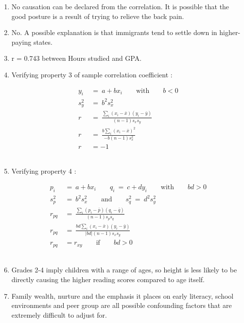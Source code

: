 \begin{enumerate}
	\item No causation can be declared from the correlation. It is possible that the good posture is a result of trying to relieve the back pain.
	
	\item No. A possible explanation is that immigrants tend to settle down in higher-paying states.
	
	\item r = 0.743 between Hours studied and GPA.
	
	\item 	Verifying property 3 of sample correlation coefficient : 
	
	
		\begin{align}
			y_i \ &=\  a + b x_i \qquad \text{with} \qquad b < 0 \\
			s_{y}^{2} \ &=\ b^2 s_{x}^2 \\
			r \ &=\ \frac{\sum_{i} (x_i - \bar{x}) (y_i - \bar{y})}{(n - 1) s_x s_y} \\
			r \ &=\ \frac{b \sum_{i} (x_i - \bar{x})^{2}}{- b (n - 1) s_{x}^{2}} \\
			r &= -1			
		\end{align}
	\\
	
	\item Verifying property 4 : 
	
	
		\begin{align}
			p_i \ &=\  a + b x_i \qquad q_i \ =\  c + d y_i \qquad \text{with} \qquad bd > 0 \\
			s_{p}^{2} \ &=\ b^2 s_{x}^2 \qquad \text{and} \qquad s_{q}^{2} \ =\ d^2 s_{y}^2 \\
			r_{pq} \ &=\ \frac{\sum_{i} (p_i - \bar{p}) (q_i - \bar{q})}{(n - 1) s_p s_q} \\
			r_{pq} \ &=\ \frac{bd \sum_{i} (x_i - \bar{x}) (y_i - \bar{y})}{|bd| (n - 1) s_{x} s_{y}} \\
			r_{pq} &= r_{xy} \qquad \text{if} \qquad bd > 0			
		\end{align}
	\\
	
	\item Grades 2-4 imply children with a range of ages, so height is less likely to be directly causing the higher reading scores  compared to age itself.
	
	\item Family wealth, nurture and the emphasis it places on early literacy, school environments and peer group are all possible confounding factors that are extremely difficult to adjust for.
	

\end{enumerate}
